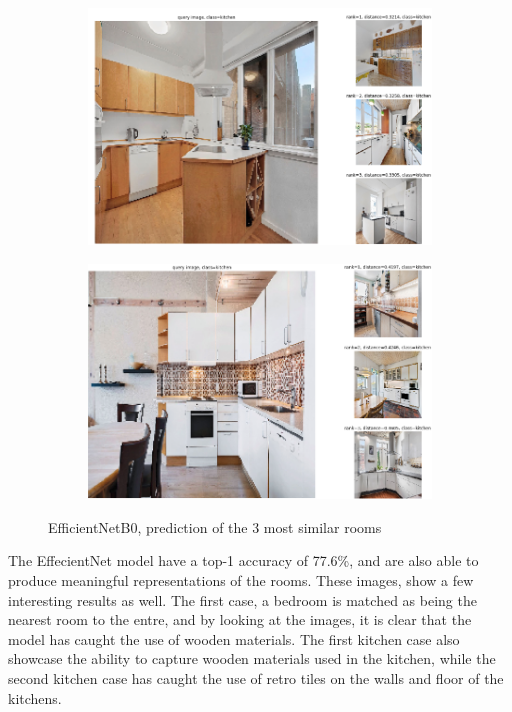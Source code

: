\begin{figure}[H]
\begin{subfigure}[b]{0.45\textwidth}
      \includegraphics[width=\textwidth]{pictures/random/efnkitchenplot}
      \label{fig:3}
    \end{subfigure}
    \hfill
    \begin{subfigure}[b]{0.45\textwidth}
      \centering
      \includegraphics[width=\textwidth]{pictures/random/efnkitchenplot1}
      \label{fig:4}
    \end{subfigure}
    \caption{EfficientNetB0, prediction of the 3 most similar rooms}
    \label{fig:misfoster}
\end{figure}
The EffecientNet model have a top-1 accuracy of 77.6\%, and are also able to produce meaningful representations of the rooms. These images, show a few interesting results as well. The first case, a bedroom is matched as being the nearest room to the entre, and by looking at the images, it is clear that the model has caught the use of wooden materials. The first kitchen case also showcase the ability to capture wooden materials used in the kitchen, while the second kitchen case has caught the use of retro tiles on the walls and floor of the kitchens.

